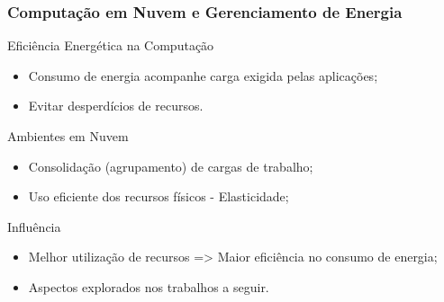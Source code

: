 % 		
% 		
% 		
% 		
% 		

\frame
{
\frametitle{Computação em Nuvem e Gerenciamento de Energia}
	\begin{block}{Eficiência Energética na Computação}\small
		\begin{itemize}
			\item Consumo de energia acompanhe carga exigida pelas aplicações;
			\item Evitar desperdícios de recursos.
		\end{itemize}
	\end{block}
	\vspace{-3mm}
	\begin{block}{Ambientes em Nuvem}\small
		\begin{itemize}
			\item Consolidação (agrupamento) de cargas de trabalho;
			\item Uso eficiente dos recursos físicos - Elasticidade;
		\end{itemize}
	\end{block}
	\vspace{-3mm}
	\begin{block}{Influência}\small
		\begin{itemize}
			\item Melhor utilização de recursos => Maior eficiência no consumo de energia;
		    \item Aspectos explorados nos trabalhos a seguir.
		\end{itemize}
	\end{block}
}

